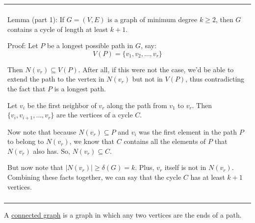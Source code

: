 \documentclass{book}
\newcommand{\hOneOld}{%
   \color{Black}%
   \fontsize{14}{14}\selectfont%
}
\newcommand{\exOneOldd}{%
   \color{Purple}%
   \fontsize{14}{14}\selectfont%
}
\newcommand{\exPOldd}{%
   \color{VioletRed}%
   \fontsize{12}{12}\selectfont%
}
\newenvironment{myConstrict}{%
   \begin{adjustwidth}{2.5em}{2.5em}%
}{%
   \end{adjustwidth}%
}
\newcommand{\udefine}[1]{{%
   \setulcolor{Red}%
   \setul{0.14em}{0.07em}%
   \ul{#1}%
}}
\newcommand{\uuline}[2][.]{%
{\vphantom{a}\color{#1}%
\rlap{\rule[-0.18em]{\widthof{#2}}{0.06em}}%
\rlap{\rule[-0.32em]{\widthof{#2}}{0.06em}}}%
#2}
\newenvironment{myClosureDeprecated}[2][.]{%
   \color{#1}%
   \begin{tabular}{|p{#2in}|} \hline \\%
}{%
   \\ \\ \hline \end{tabular}%
}
\newcommand{\retTwo}{\hfill\bigbreak}
\begin{document}
\exOneOldd
\begin{center}
\begin{myClosureDeprecated}{5.5}
   \uuline{Lemma (part 1)}: If $G = (V, E)$ is a graph of minimum degree
   $k \geq 2$, then $G$ contains a cycle of length at least
   $k + 1$.

   {\exPOldd \begin{myConstrict}
      Proof: Let $P$ be a longest possible path in $G$, say:
      \[V(P) = \{v_1, v_2, \ldots, v_r\}\]

      Then $N(v_r) \subseteq V(P)$. After all, if this were not 
      the case, we'd be able to extend the path to the vertex in 
      $N(v_r)$ but not in $V(P)$, thus contradicting the fact that
      $P$ is a longest path. \retTwo

      Let $v_i$ be the first neighbor of $v_r$ along the path from
      $v_1$ to $v_r$. Then $\{v_i, v_{i+1}, \ldots, v_r\}$ are the
      vertices of a cycle $C$. \retTwo

      Now note that because $N(v_r) \subseteq P$ and $v_i$ was
      the first element in the path $P$ to belong to $N(v_r)$, 
      we know that $C$ contains all the elements of $P$ that 
      $N(v_r)$ also has. So, $N(v_r) \subseteq C$. \retTwo

      But now note that $\lvert N(v_r) \rvert \geq \delta(G)=k$. Plus,
      $v_r$ itself is not in $N(v_r)$. Combining these facts together,
      we can say that the cycle $C$ has at least $k + 1$ vertices.
   \end{myConstrict}}

   \uuline{Lemma (part 2)}: The cycle length $k+1$ is the longest 
   we can guarentee based on the minimum degree of the graph being $k$.

   {\exPOldd \begin{myConstrict}
      Proof: Take the graph $K_{k+1}$ which has a minimum degree $k$. 
      \newline
      Obviously, the longest cycle in $K_{k+1}$ is the cycle containing
      all $k+1$ elements of $K_{k+1}$. Thus, we have shown that there
      are graphs with minimum degree $k$ which don't have cycles of
      length greater than \newline $k + 1$.
   \end{myConstrict}} 
\end{myClosureDeprecated}
\end{center}
\retTwo

\hOneOld
A \udefine{connected graph} is a graph in which any two vertices
are the ends of a path. \retTwo
\end{document}
